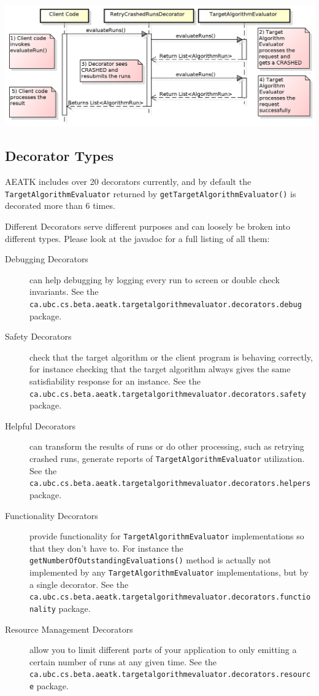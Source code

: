 \documentclass[11pt,letterpaper,oneside]{article}
\begin{document}
\begin{center}
\includegraphics[scale=0.75]{img/UML/TAEDecoration.png}
\end{center}


\subsection{Decorator Types}

AEATK includes over 20 decorators currently, and by default the \texttt{TargetAlgorithmEvaluator} returned by \texttt{getTargetAlgorithmEvaluator()} is decorated more than 6 times.

Different Decorators serve different purposes and can loosely be broken into different types. Please look at the javadoc for a full listing of all them:

\begin{description}
\item[Debugging Decorators] can help debugging by logging every run to screen or double check invariants. See the \texttt{ca.ubc.cs.beta.aeatk.targetalgorithmevaluator.decorators.debug} package.
\item[Safety Decorators] check that the target algorithm or the client program is behaving correctly, for instance checking that the target algorithm always gives the same satisfiability response for an instance. See the\\ \texttt{ca.ubc.cs.beta.aeatk.targetalgorithmevaluator.decorators.safety} package.
\item[Helpful Decorators] can transform the results of runs or do other processing, such as retrying crashed runs, generate reports of \texttt{TargetAlgorithmEvaluator} utilization. See the \\ \texttt{ca.ubc.cs.beta.aeatk.targetalgorithmevaluator.decorators.helpers} package.
\item[Functionality Decorators] provide functionality for \texttt{TargetAlgorithmEvaluator} implementations so that they don't have to. For instance the \texttt{getNumberOfOutstandingEvaluations()} method is actually not implemented by any \texttt{TargetAlgorithmEvaluator} implementations, but by a single decorator. See the \\ \texttt{ca.ubc.cs.beta.aeatk.targetalgorithmevaluator.decorators.functionality} package.
\item[Resource Management Decorators] allow you to limit different parts of your application to only emitting a certain number of runs at any given time. See the \\
\texttt{ca.ubc.cs.beta.aeatk.targetalgorithmevaluator.decorators.resource} package.
\end{description}
\end{document}
